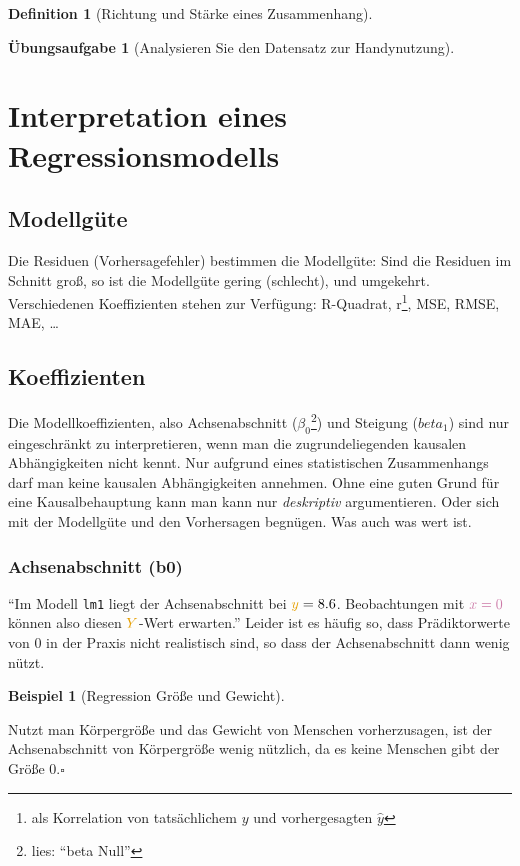 \documentclass[
  a4paper,
  DIV=11]{scrreprt}
\theoremstyle{definition}
\newtheorem{exercise}{Übungsaufgabe}[chapter]
\theoremstyle{definition}
\newtheorem{example}{Beispiel}[chapter]
\theoremstyle{definition}
\newtheorem{definition}{Definition}[chapter]
\theoremstyle{remark}
\begin{document}
\begin{definition}[Richtung und Stärke eines
Zusammenhang]
\begin{exercise}[Analysieren Sie den Datensatz zur
Handynutzung]
\section{Interpretation eines
Regressionsmodells}\label{sec-interpret-reg-mod}

\subsection{Modellgüte}\label{modellguxfcte-1}

Die Residuen (Vorhersagefehler) bestimmen die Modellgüte: Sind die
Residuen im Schnitt groß, so ist die Modellgüte gering (schlecht), und
umgekehrt. Verschiedenen Koeffizienten stehen zur Verfügung: R-Quadrat,
r\footnote{als Korrelation von tatsächlichem \(y\) und vorhergesagten
  \(\hat{y}\)}, MSE, RMSE, MAE, \ldots{}

\subsection{Koeffizienten}\label{koeffizienten}

Die Modellkoeffizienten, also Achsenabschnitt (\(\beta_0\)\footnote{lies:
  ``beta Null''}) und Steigung (\(beta_1\)) sind nur eingeschränkt zu
interpretieren, wenn man die zugrundeliegenden kausalen Abhängigkeiten
nicht kennt. Nur aufgrund eines statistischen Zusammenhangs darf man
keine kausalen Abhängigkeiten annehmen. Ohne eine guten Grund für eine
Kausalbehauptung kann man kann nur \emph{deskriptiv} argumentieren. Oder
sich mit der Modellgüte und den Vorhersagen begnügen. Was auch was wert
ist.

\subsubsection{Achsenabschnitt (b0)}\label{achsenabschnitt-b0}

``Im Modell \texttt{lm1} liegt der Achsenabschnitt bei
\(\textcolor{ycol}{y}=8.6\). Beobachtungen mit \(\color{xcol}{x}=0\)
können also diesen \(\textcolor{ycol}{Y}\)-Wert erwarten.'' Leider ist
es häufig so, dass Prädiktorwerte von 0 in der Praxis nicht realistisch
sind, so dass der Achsenabschnitt dann wenig nützt.

\begin{example}[Regression Größe und
Gewicht]\protect\hypertarget{exm-groesse}{}\label{exm-groesse}

Nutzt man Körpergröße und das Gewicht von Menschen vorherzusagen, ist
der Achsenabschnitt von Körpergröße wenig nützlich, da es keine Menschen
gibt der Größe 0.\(\square\)


\end{example}
\end{exercise}
\end{definition}
\end{document}
